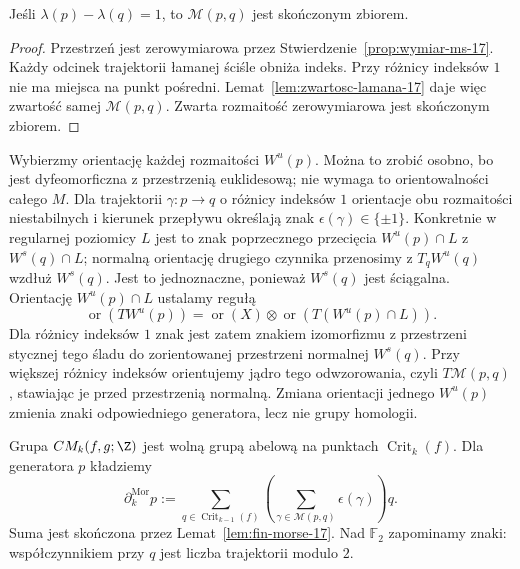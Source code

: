 \begin{lemat}
\label{lem:fin-morse-17}
Jeśli $\lambda(p)-\lambda(q)=1$,
to $\mathcal M(p,q)$ jest
skończonym zbiorem.
\end{lemat}
\begin{proof}
Przestrzeń jest zerowymiarowa przez
Stwierdzenie~\ref{prop:wymiar-ms-17}.
Każdy odcinek trajektorii łamanej ściśle obniża indeks.
Przy różnicy indeksów $1$ nie ma miejsca na punkt pośredni.
Lemat~\ref{lem:zwartosc-lamana-17} daje więc zwartość
samej $\mathcal M(p,q)$. Zwarta rozmaitość
zerowymiarowa jest skończonym zbiorem.
\end{proof}

Wybierzmy orientację każdej
rozmaitości $W^u(p)$.
Można to zrobić osobno,
bo jest dyfeomorficzna
z przestrzenią euklidesową;
nie wymaga to orientowalności
całego $M$. Dla trajektorii
$\gamma:p\to q$ o różnicy
indeksów $1$ orientacje
obu rozmaitości niestabilnych
i kierunek przepływu określają
znak $\epsilon(\gamma)\in\{\pm1\}$.
Konkretnie w regularnej
poziomicy $L$ jest to znak
poprzecznego przecięcia
$W^u(p)\cap L$ z
$W^s(q)\cap L$;
normalną orientację drugiego czynnika
przenosimy z $T_qW^u(q)$ wzdłuż $W^s(q)$.
Jest to jednoznaczne, ponieważ $W^s(q)$ jest ściągalna.
Orientację $W^u(p)\cap L$ ustalamy regułą
\[
 \operatorname{or}(TW^u(p))
 =\operatorname{or}(X)\otimes
   \operatorname{or}(T(W^u(p)\cap L)).
\]
Dla różnicy indeksów $1$ znak jest zatem znakiem
izomorfizmu z przestrzeni stycznej tego śladu
do zorientowanej przestrzeni normalnej $W^s(q)$.
Przy większej różnicy indeksów orientujemy jądro
tego odwzorowania, czyli $T\mathcal M(p,q)$,
stawiając je przed przestrzenią normalną.
Zmiana orientacji jednego
$W^u(p)$ zmienia znaki
odpowiedniego generatora,
lecz nie grupy homologii.

\begin{definicja}
\label{def:kompleks-morse-17}
Grupa $CM_k(f,g;\Z)$ jest wolną
grupą abelową na punktach
$\operatorname{Crit}_k(f)$.
Dla generatora $p$ kładziemy
\begin{equation}\label{eq:brzeg-morse-17}
 \partial^{\mathrm{Mor}}_k p
 :=\sum_{q\in\operatorname{Crit}_{k-1}(f)}
  \left(\sum_{\gamma\in\mathcal M(p,q)}
                    \epsilon(\gamma)\right)q.
\end{equation}
Suma jest skończona przez
Lemat~\ref{lem:fin-morse-17}.
Nad $\mathbb F_2$ zapominamy znaki:
współczynnikiem przy $q$
jest liczba trajektorii modulo $2$.
\end{definicja}


